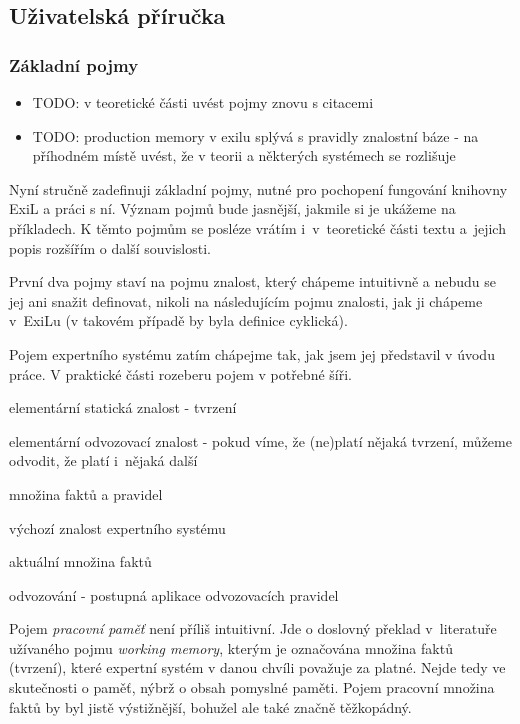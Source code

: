 \subsection{Uživatelská příručka}
\subsubsection{Základní pojmy}
\begin{framed}
  \begin{itemize}
    \item TODO: v teoretické části uvést pojmy znovu s citacemi
    \item TODO: production memory v exilu splývá s pravidly znalostní báze - na
      příhodném místě uvést, že v teorii a některých systémech se rozlišuje
  \end{itemize}
\end{framed}

Nyní stručně zadefinuji základní pojmy, nutné pro pochopení fungování knihovny
ExiL a práci s ní. Význam pojmů bude jasnější, jakmile si je ukážeme na
příkladech. K těmto pojmům se posléze vrátím i~v~teoretické části textu
a~jejich popis rozšířím o další souvislosti.

První dva pojmy staví na pojmu znalost, který chápeme intuitivně a nebudu se jej
ani snažit definovat, nikoli na následujícím pojmu znalosti, jak ji chápeme
v~ExiLu (v takovém případě by byla definice cyklická).

Pojem expertního systému zatím chápejme tak, jak jsem jej představil v úvodu
práce. V praktické části rozeberu pojem v potřebné šíři.
\begin{description}[leftmargin=6cm,style=sameline,align=right,labelsep=0.5cm]
  \item[fakt] elementární statická znalost - tvrzení
  \item[(odvozovací) pravidlo] elementární odvozovací znalost - pokud víme, že
    (ne)platí nějaká tvrzení, můžeme odvodit, že platí i~nějaká další
  \item[znalost (v ExiLu)] množina faktů a pravidel
  \item[znalostní báze] výchozí znalost expertního systému
  \item[pracovní paměť] aktuální množina faktů
  \item[inference] odvozování - postupná aplikace odvozovacích pravidel
\end{description}
Pojem \emph{pracovní paměť} není příliš intuitivní. Jde o doslovný překlad
v~literatuře užívaného pojmu \emph{working memory}, kterým je označována množina
faktů (tvrzení), které expertní systém v danou chvíli považuje za platné. Nejde
tedy ve skutečnosti o paměť, nýbrž o obsah pomyslné paměti. Pojem pracovní
množina faktů by byl jistě výstižnější, bohužel ale také značně těžkopádný.

